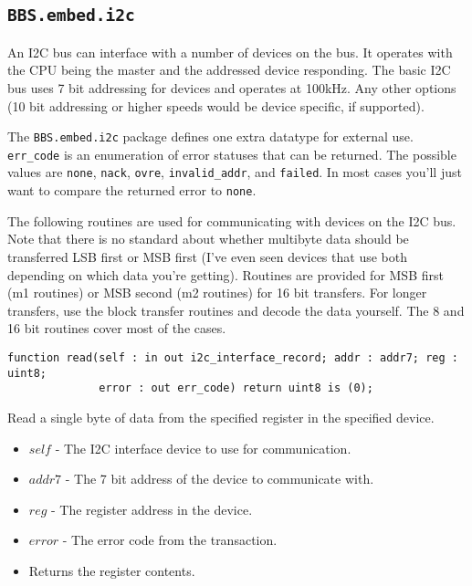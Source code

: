 \documentclass[10pt, openany]{book}
\newcommand{\indextype}[1]{\index[type]{#1}}
\newcommand{\indexfunc}[1]{\index[func]{#1}}
\newcommand{\package}[1]{\texttt{#1}}
\newcommand{\datatype}[1]{\texttt{#1}}
\begin{document}
\subsection{\package{BBS.embed.i2c}}
An I2C bus can interface with a number of devices on the bus.  It operates with the CPU being the master and the addressed device responding.  The basic I2C bus uses 7 bit addressing for devices and operates at 100kHz.  Any other options (10 bit addressing or higher speeds would be device specific, if supported).

The \package{BBS.embed.i2c} package defines one extra datatype for external use.  \datatype{err\_code} is an enumeration of error statuses that can be returned.  The possible values are \datatype{none}, \datatype{nack}, \datatype{ovre}, \datatype{invalid\_addr}, and \datatype{failed}.  In most cases you'll just want to compare the returned error to \datatype{none}.
\indextype{err\_code}

The following routines are used for communicating with devices on the I2C bus.  Note that there is no standard about whether multibyte data should be transferred LSB first or MSB first (I've even seen devices that use both depending on which data you're getting).  Routines are provided for MSB first (m1 routines) or MSB second (m2 routines) for 16 bit transfers.  For longer transfers, use the block transfer routines and decode the data yourself.  The 8 and 16 bit routines cover most of the cases.
\begin{lstlisting}
function read(self : in out i2c_interface_record; addr : addr7; reg : uint8;
              error : out err_code) return uint8 is (0);
\end{lstlisting}
\indexfunc{read}
Read a single byte of data from the specified register in the specified device.
\begin{itemize}
  \item $self$ - The I2C interface device to use for communication.
  \item $addr7$ - The 7 bit address of the device to communicate with.
  \item $reg$ - The register address in the device.
  \item $error$ - The error code from the transaction.
  \item Returns the register contents.
\end{itemize}
\end{document}
